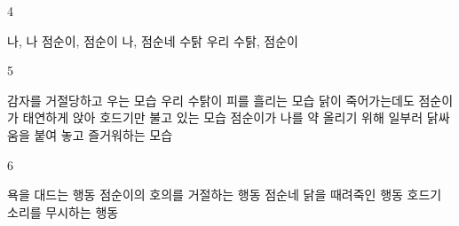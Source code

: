 \documentclass[fs9,seriesRus]{korfarm-base}
\begin{document}
\begin{kfSentenceUnit}{4}{}
\begin{kfChoices}
\kfChoice 나, 나
\kfChoice 점순이, 점순이
\kfChoice 나, 점순네 수탉
\kfChoice 우리 수탉, 점순이
\end{kfChoices}
\end{kfSentenceUnit}

\begin{kfSentenceUnit}{5}{}
\begin{kfChoices}
\kfChoice 감자를 거절당하고 우는 모습
\kfChoice 우리 수탉이 피를 흘리는 모습
\kfChoice 닭이 죽어가는데도 점순이가 태연하게 앉아 호드기만 불고 있는 모습
\kfChoice 점순이가 나를 약 올리기 위해 일부러 닭싸움을 붙여 놓고 즐거워하는 모습
\end{kfChoices}
\end{kfSentenceUnit}

\begin{kfSentenceUnit}{6}{}
\begin{kfChoices}
\kfChoice 욕을 대드는 행동
\kfChoice 점순이의 호의를 거절하는 행동
\kfChoice 점순네 닭을 때려죽인 행동
\kfChoice 호드기 소리를 무시하는 행동
\end{kfChoices}
\end{kfSentenceUnit}

\kfEndMC
\end{document}
